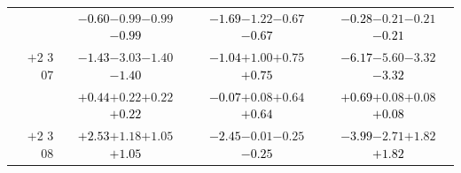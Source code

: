 \documentclass[compress]{beamer}
\begin{document}
\begin{frame}
\begin{tabular}{r | c | c | c}
          & \textcolor{black}{$-0.60$}\hspace{0.1 cm}$-0.99$\hspace{0.1 cm}$-0.99$\hspace{0.1 cm}\textcolor{black}{$-0.99$} & \textcolor{black}{$-1.69$}\hspace{0.1 cm}$-1.22$\hspace{0.1 cm}$-0.67$\hspace{0.1 cm}\textcolor{black}{$-0.67$} & \textcolor{black}{$-0.28$}\hspace{0.1 cm}$-0.21$\hspace{0.1 cm}$-0.21$\hspace{0.1 cm}\textcolor{black}{$-0.21$} \\
$+$2 3 07 & \textcolor{black}{$-1.43$}\hspace{0.1 cm}$-3.03$\hspace{0.1 cm}$-1.40$\hspace{0.1 cm}\textcolor{black}{$-1.40$} & \textcolor{black}{$-1.04$}\hspace{0.1 cm}$+1.00$\hspace{0.1 cm}$+0.75$\hspace{0.1 cm}\textcolor{black}{$+0.75$} & \textcolor{black}{$-6.17$}\hspace{0.1 cm}$-5.60$\hspace{0.1 cm}$-3.32$\hspace{0.1 cm}\textcolor{black}{$-3.32$} \\
          & \textcolor{black}{$+0.44$}\hspace{0.1 cm}$+0.22$\hspace{0.1 cm}$+0.22$\hspace{0.1 cm}\textcolor{black}{$+0.22$} & \textcolor{black}{$-0.07$}\hspace{0.1 cm}$+0.08$\hspace{0.1 cm}$+0.64$\hspace{0.1 cm}\textcolor{black}{$+0.64$} & \textcolor{black}{$+0.69$}\hspace{0.1 cm}$+0.08$\hspace{0.1 cm}$+0.08$\hspace{0.1 cm}\textcolor{black}{$+0.08$} \\
$+$2 3 08 & \textcolor{black}{$+2.53$}\hspace{0.1 cm}$+1.18$\hspace{0.1 cm}$+1.05$\hspace{0.1 cm}\textcolor{black}{$+1.05$} & \textcolor{black}{$-2.45$}\hspace{0.1 cm}$-0.01$\hspace{0.1 cm}$-0.25$\hspace{0.1 cm}\textcolor{black}{$-0.25$} & \textcolor{black}{$-3.99$}\hspace{0.1 cm}$-2.71$\hspace{0.1 cm}$+1.82$\hspace{0.1 cm}\textcolor{black}{$+1.82$} \\

\end{tabular}
\end{frame}
\end{document}
